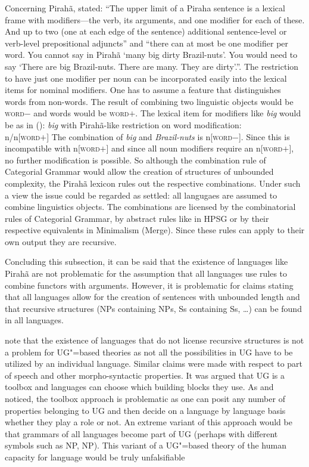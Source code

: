 Concerning Pirahã, \citet[]{Everett2012a} stated: ``The upper limit of a Piraha sentence is
a lexical frame with modifiers—the verb, its arguments, and one modifier for each of these. And up
to two (one at each edge of the sentence) additional sentence-level or verb-level prepositional
adjuncts'' and ``there can at most be one modifier per word. You cannot say in Pirahã `many big
dirty Brazil-nuts'. You would need to say `There are big Brazil-nuts. There are many. They are
dirty'.''. The restriction to have just one modifier per noun can be incorporated easily into the
lexical items for nominal modifiers. One has to assume a feature that distinguishes words from
non-words. The result of combining two linguistic objects would be \textsc{word}$-$ and words would
be \textsc{word}$+$. The lexical item for modifiers like \emph{big} would be as in ():
\ea
\emph{big} with Pirahã-like restriction on word modification:\\
n/n[\textsc{word}$+$]
\z
The combination of \emph{big} and \emph{Brazil-nuts} is n[\textsc{word}$-$]. Since this is
incompatible with n[\textsc{word}$+$] and since all noun modifiers require an n[\textsc{word}$+$],
no further modification is possible. So although the combination rule of Categorial Grammar would
allow the creation of structures of unbounded complexity, the Pirahã lexicon rules out the
respective combinations. Under such a view the issue could be regarded as settled: all langugaes are
assumed to combine linguistics objects. The combinations are licensed by the combinatorial rules of
Categorial Grammar, by abstract rules like in HPSG or by their respective equivalents in Minimalism
(Merge). Since these rules can apply to their own output they are recursive. 

Concluding this subsection, it can be said that the existence of languages like Pirahã are not
problematic for the assumption that all languages use rules to combine functors with
arguments. However, it is problematic for claims stating that all languages allow for the creation
of sentences with unbounded length and that recursive structures (NPs containing NPs, Ss containing
Ss, \ldots)  can be found in all languages.

\citet*[]{FHC2005a} note that the existence of languages that do not license recursive
structures is not a problem for UG"=based theories as not all the possibilities in UG have to be
utilized by an individual language. Similar claims were made with respect to part of speech and
other morpho-syntactic properties. It was argued that UG is a toolbox and languages can choose which
building blocks they use. As \citet[, 443]{EL2009a} and \citet[]{Tomasello2009a}
noticed, the toolbox approach is problematic as one can posit any number of properties belonging to
UG and then decide on a language by language basis whether they play a role or not. An extreme
variant of this approach would be that grammars of all languages become part of UG (perhaps with
different symbols such as NP, NP). This variant of a UG"=based theory of
the human capacity for language would be truly unfalsifiable

